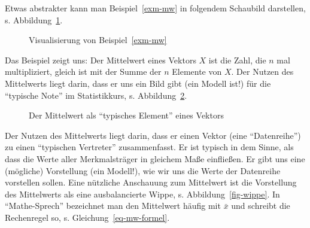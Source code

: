 \documentclass[
  letterpaper,
]{scrbook}
\theoremstyle{definition}
\theoremstyle{definition}
\theoremstyle{definition}
\theoremstyle{remark}
\begin{document}
Etwas abstrakter kann man Beispiel~\ref{exm-mw} in folgendem Schaubild
darstellen, s. Abbildung~\ref{fig-eq-mw}.

\begin{figure}


\caption{\label{fig-eq-mw}Visualisierung von Beispiel~\ref{exm-mw}}

\end{figure}%

Das Beispiel zeigt uns: Der Mittelwert eines Vektors \(X\) ist die Zahl,
die \(n\) mal multipliziert, gleich ist mit der Summe der \(n\) Elemente
von \(X\). Der Nutzen des Mittelwerts liegt darin, dass er uns ein Bild
gibt (ein Modell ist!) für die \enquote{typische Note} im Statistikkurs,
s. Abbildung~\ref{fig-mw2}.

\begin{figure}


\caption{\label{fig-mw2}Der Mittelwert als \enquote{typisches Element}
eines Vektors}

\end{figure}%

Der Nutzen des Mittelwerts liegt darin, dass er einen Vektor (eine
\enquote{Datenreihe}) zu einen \enquote{typischen Vertreter}
zusammenfasst. Er ist typisch in dem Sinne, als dass die Werte aller
Merkmalsträger in gleichem Maße einfließen. Er gibt uns eine (mögliche)
Vorstellung (ein Modell!), wie wir uns die Werte der Datenreihe
vorstellen sollen. Eine nützliche Anschauung zum Mittelwert ist die
Vorstellung des Mittelwerts als eine ausbalancierte Wippe, s.
Abbildung~\ref{fig-wippe}. In \enquote{Mathe-Sprech} bezeichnet man den
Mittelwert häufig mit \(\bar{x}\) und schreibt die Rechenregel so, s.
Gleichung~\ref{eq-mw-formel}.
\end{document}
